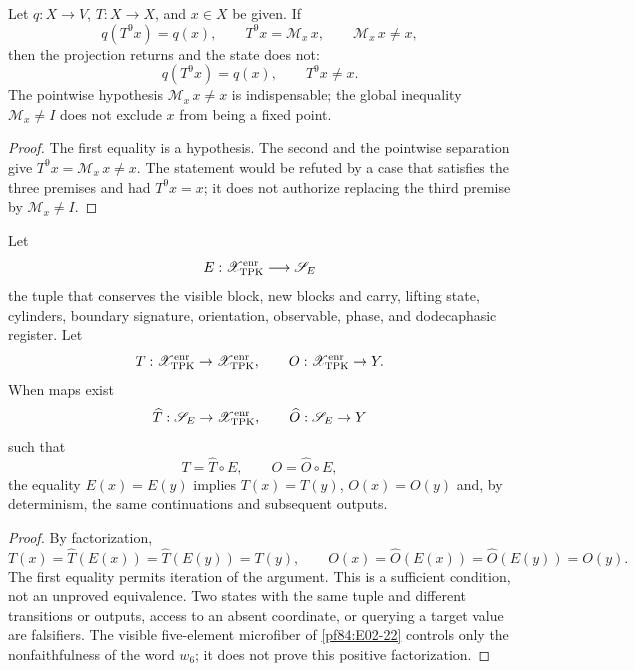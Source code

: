 \begin{corollary}
\label{pf84:E02-29}
Let \(q:X\to V\), \(T:X\to X\), and \(x\in X\) be given. If
\[
 q(T^9x)=q(x),\qquad
 T^9x=\mathcal M_x\,x,\qquad
 \mathcal M_x\,x\ne x,
\]
then the projection returns and the state does not:
\[
 q(T^9x)=q(x),\qquad T^9x\ne x.
\]
The pointwise hypothesis \(\mathcal M_x\,x\ne x\) is indispensable; the global
inequality \(\mathcal M_x\ne I\) does not exclude \(x\) from being a fixed point.
\end{corollary}

\begin{proof}
The first equality is a hypothesis. The second and the pointwise separation give
\(T^9x=\mathcal M_x\,x\ne x\). The statement would be refuted by a case that
satisfies the three premises and had \(T^9x=x\); it does not authorize replacing the
third premise by \(\mathcal M_x\ne I\).
\end{proof}

\begin{theorem}
\label{pf84:E02-30}
Let
\[
 E:\mathscr X_{\rm TPK}^{\rm enr}\longrightarrow\mathscr S_E
\]
the tuple that conserves the visible block, new blocks and carry, lifting
state, cylinders, boundary signature, orientation, observable, phase, and
dodecaphasic register. Let
\[
 T:\mathscr X_{\rm TPK}^{\rm enr}\to
 \mathscr X_{\rm TPK}^{\rm enr},
 \qquad
 O:\mathscr X_{\rm TPK}^{\rm enr}\to Y.
\]
When maps exist
\[
 \widehat T:\mathscr S_E\to\mathscr X_{\rm TPK}^{\rm enr},
 \qquad
 \widehat O:\mathscr S_E\to Y
\]
such that
\[
 T=\widehat T\circ E,\qquad O=\widehat O\circ E,
\]
the equality \(E(x)=E(y)\) implies \(T(x)=T(y)\), \(O(x)=O(y)\) and, by
determinism, the same continuations and subsequent outputs.
\end{theorem}

\begin{proof}
By factorization,
\[
 T(x)=\widehat T(E(x))=\widehat T(E(y))=T(y),
 \qquad
 O(x)=\widehat O(E(x))=\widehat O(E(y))=O(y).
\]
The first equality permits iteration of the argument. This is a sufficient
condition, not an unproved equivalence. Two states with the same tuple and
different transitions or outputs, access to an absent coordinate, or
querying a target value are falsifiers. The visible five-element microfiber
of \cref{pf84:E02-22} controls only the nonfaithfulness of the
word \(w_6\); it does not prove this positive factorization.
\end{proof}

